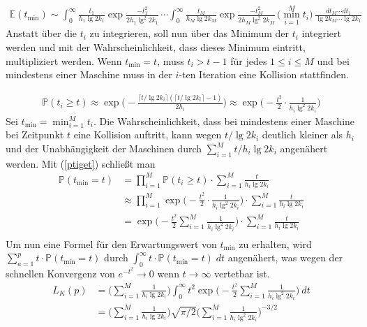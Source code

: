 \documentclass[a4paper, 10pt, ngerman]{article}
\newcommand{\E}{\mathbb{E}}
\renewcommand{\P}{\mathbb{P}}
\begin{document}
\begin{align*}
    \E(t_{\min}) \sim \int_{0}^{\infty} \frac {t_1} {h_1 \lg 2k_1} \exp \frac {-t_1^2} {2h_1 \lg^2 2k_1} \, \cdots \int_{0}^{\infty} \frac {t_M} {h_M \lg 2k_M} \exp \frac {-t_M^2} {2h_M \lg^2 2k_M} \, \bigg ( \min_{i = 1}^M {t_i} \bigg ) \ \frac {dt_M \cdots dt_1} {\lg 2k_M \cdots \lg 2k_1}
\end{align*}
Anstatt über die $t_i$ zu integrieren, soll nun über das Minimum der $t_i$ integriert werden und mit der Wahrscheinlichkeit, dass dieses Minimum eintritt, multipliziert werden. Wenn $t_{\min} = t$, muss $t_i > t - 1$ für jedes $1 \le i \le M$ und bei mindestens einer Maschine muss in der $i$-ten Iteration eine Kollision stattfinden.

\begin{align}
    \P(t_i \ge t)
    \approx \exp \Bigg (- \frac {\lceil t / \lg 2k_i \rceil (\lceil t / \lg 2k_i \rceil - 1)} {2h_i} \Bigg )
    \approx \exp \Bigg ( - \frac {t^2} 2 \cdot \frac 1{h_i \lg^2 2k_i} \Bigg ) \label{ptiget}
\end{align}
Sei $t_{\min} = \min_{i = 1}^M t_i$. Die Wahrscheinlichkeit, dass bei mindestens einer Maschine bei Zeitpunkt $t$ eine Kollision auftritt, kann wegen $t / \lg 2k_i$ deutlich kleiner als $h_i$ und der Unabhängigkeit der Maschinen durch $\sum_{i = 1}^M t/h_i\lg2k_i$ angenähert werden. Mit (\ref{ptiget}) schließt man
\begin{align*}
    \P(t_{\min} = t)
     & = \prod_{i = 1}^M \P(t_i \ge t) \cdot \sum_{i = 1}^M \frac {t} {h_i\lg2k_i}                                                            \\
     & \approx \prod_{i = 1}^M \exp \Bigg ( - \frac {t^2} 2 \cdot \frac 1{h_i \lg^2 2k_i} \Bigg ) \cdot \sum_{i = 1}^M \frac {t} {h_i\lg2k_i} \\
     & = \exp \Bigg ( - \frac {t^2} 2 \sum_{i = 1}^M \frac 1{h_i \lg^2 2k_i} \Bigg ) \cdot \sum_{i = 1}^M \frac {t} {h_i\lg2k_i}              \\
\end{align*}
Um nun eine Formel für den Erwartungswert von $t_{\min}$ zu erhalten, wird $\sum_{a = 1}^p t \cdot \P(t_{\min} = t)$ durch $\int_{0}^\infty t \cdot \P(t_{\min} = t) \; dt$ angenähert, was wegen der schnellen Konvergenz von $e^{-t^2} \to 0$ wenn $t \to \infty$ vertetbar ist.
\begin{align}
    L_K(p)
     & = \Bigg ( \sum_{i = 1}^M \frac 1 {h_i \lg 2k_i} \Bigg ) \int_{0}^{\infty} t^2 \exp \Bigg (- \frac {t^2} 2 \sum_{i = 1}^M \frac 1 {h_i \lg^2 2k_i} \Bigg ) \ dt \nonumber \\
     & = \Bigg ( \sum_{i = 1}^M \frac 1 {h_i \lg 2k_i} \Bigg ) \sqrt {\pi/2} \Bigg (\sum_{i = 1}^M \frac 1 {h_i \lg^2 2k_i} \Bigg )^{-3/2}
    \label{lkp}
\end{align}
\end{document}
